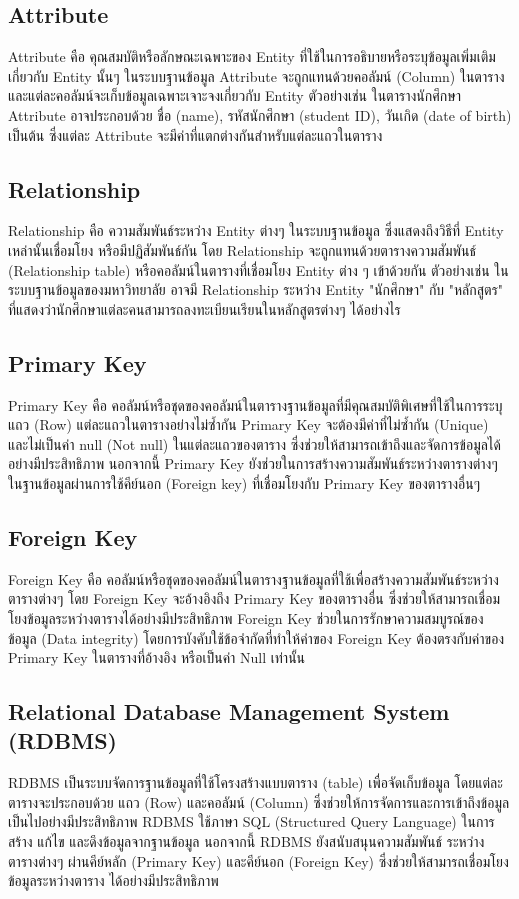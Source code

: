   \subsection{Attribute}
    \qquad Attribute คือ คุณสมบัติหรือลักษณะเฉพาะของ Entity ที่ใช้ในการอธิบายหรือระบุข้อมูลเพิ่มเติมเกี่ยวกับ Entity นั้นๆ
    ในระบบฐานข้อมูล Attribute จะถูกแทนด้วยคอลัมน์ (Column) ในตาราง และแต่ละคอลัมน์จะเก็บข้อมูลเฉพาะเจาะจงเกี่ยวกับ
    Entity ตัวอย่างเช่น ในตารางนักศึกษา Attribute อาจประกอบด้วย ชื่อ (name), รหัสนักศึกษา (student ID),
    วันเกิด (date of birth) เป็นต้น ซึ่งแต่ละ Attribute จะมีค่าที่แตกต่างกันสำหรับแต่ละแถวในตาราง \cite{Attribute}
  \subsection{Relationship}
    \qquad Relationship คือ ความสัมพันธ์ระหว่าง Entity ต่างๆ ในระบบฐานข้อมูล ซึ่งแสดงถึงวิธีที่ Entity เหล่านั้นเชื่อมโยง
    หรือมีปฏิสัมพันธ์กัน โดย Relationship จะถูกแทนด้วยตารางความสัมพันธ์ (Relationship table)
    หรือคอลัมน์ในตารางที่เชื่อมโยง Entity ต่าง ๆ เข้าด้วยกัน ตัวอย่างเช่น ในระบบฐานข้อมูลของมหาวิทยาลัย อาจมี
    Relationship ระหว่าง Entity "นักศึกษา" กับ "หลักสูตร" ที่แสดงว่านักศึกษาแต่ละคนสามารถลงทะเบียนเรียนในหลักสูตรต่างๆ ได้อย่างไร
  \subsection{Primary Key}
    \qquad Primary Key คือ คอลัมน์หรือชุดของคอลัมน์ในตารางฐานข้อมูลที่มีคุณสมบัติพิเศษที่ใช้ในการระบุแถว (Row)
    แต่ละแถวในตารางอย่างไม่ซ้ำกัน Primary Key จะต้องมีค่าที่ไม่ซ้ำกัน (Unique) และไม่เป็นค่า null (Not null)
    ในแต่ละแถวของตาราง ซึ่งช่วยให้สามารถเข้าถึงและจัดการข้อมูลได้อย่างมีประสิทธิภาพ นอกจากนี้ Primary Key
    ยังช่วยในการสร้างความสัมพันธ์ระหว่างตารางต่างๆ ในฐานข้อมูลผ่านการใช้คีย์นอก (Foreign key) ที่เชื่อมโยงกับ
    Primary Key ของตารางอื่นๆ \cite{PrimaryKey}
  \subsection{Foreign Key}
    \qquad Foreign Key คือ คอลัมน์หรือชุดของคอลัมน์ในตารางฐานข้อมูลที่ใช้เพื่อสร้างความสัมพันธ์ระหว่างตารางต่างๆ โดย
    Foreign Key จะอ้างอิงถึง Primary Key ของตารางอื่น ซึ่งช่วยให้สามารถเชื่อมโยงข้อมูลระหว่างตารางได้อย่างมีประสิทธิภาพ
    Foreign Key ช่วยในการรักษาความสมบูรณ์ของข้อมูล (Data integrity) โดยการบังคับใช้ข้อจำกัดที่ทำให้ค่าของ
    Foreign Key ต้องตรงกับค่าของ Primary Key ในตารางที่อ้างอิง หรือเป็นค่า Null เท่านั้น \cite{ForeignKey}
  \subsection{Relational Database Management System (RDBMS)}
    \qquad RDBMS เป็นระบบจัดการฐานข้อมูลที่ใช้โครงสร้างแบบตาราง (table) เพื่อจัดเก็บข้อมูล โดยแต่ละตารางจะประกอบด้วย
    แถว (Row) และคอลัมน์ (Column) ซึ่งช่วยให้การจัดการและการเข้าถึงข้อมูลเป็นไปอย่างมีประสิทธิภาพ RDBMS ใช้ภาษา SQL
    (Structured Query Language) ในการสร้าง แก้ไข และดึงข้อมูลจากฐานข้อมูล นอกจากนี้ RDBMS ยังสนับสนุนความสัมพันธ์
    ระหว่างตารางต่างๆ ผ่านคีย์หลัก (Primary Key) และคีย์นอก (Foreign Key) ซึ่งช่วยให้สามารถเชื่อมโยงข้อมูลระหว่างตาราง
    ได้อย่างมีประสิทธิภาพ \cite{RDBMS}


